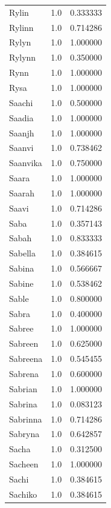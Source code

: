 \documentclass[
  letterpaper,
  DIV=11,
  numbers=noendperiod]{scrreprt}
\begin{document}
\begin{tabular}{lrr}
Rylin           &   1.0 &   0.333333 \\
Rylinn          &   1.0 &   0.714286 \\
Rylyn           &   1.0 &   1.000000 \\
Rylynn          &   1.0 &   0.350000 \\
Rynn            &   1.0 &   1.000000 \\
Rysa            &   1.0 &   1.000000 \\
Saachi          &   1.0 &   0.500000 \\
Saadia          &   1.0 &   1.000000 \\
Saanjh          &   1.0 &   1.000000 \\
Saanvi          &   1.0 &   0.738462 \\
Saanvika        &   1.0 &   0.750000 \\
Saara           &   1.0 &   1.000000 \\
Saarah          &   1.0 &   1.000000 \\
Saavi           &   1.0 &   0.714286 \\
Saba            &   1.0 &   0.357143 \\
Sabah           &   1.0 &   0.833333 \\
Sabella         &   1.0 &   0.384615 \\
Sabina          &   1.0 &   0.566667 \\
Sabine          &   1.0 &   0.538462 \\
Sable           &   1.0 &   0.800000 \\
Sabra           &   1.0 &   0.400000 \\
Sabree          &   1.0 &   1.000000 \\
Sabreen         &   1.0 &   0.625000 \\
Sabreena        &   1.0 &   0.545455 \\
Sabrena         &   1.0 &   0.600000 \\
Sabrian         &   1.0 &   1.000000 \\
Sabrina         &   1.0 &   0.083123 \\
Sabrinna        &   1.0 &   0.714286 \\
Sabryna         &   1.0 &   0.642857 \\
Sacha           &   1.0 &   0.312500 \\
Sacheen         &   1.0 &   1.000000 \\
Sachi           &   1.0 &   0.384615 \\
Sachiko         &   1.0 &   0.384615 \\

\end{tabular}
\end{document}
